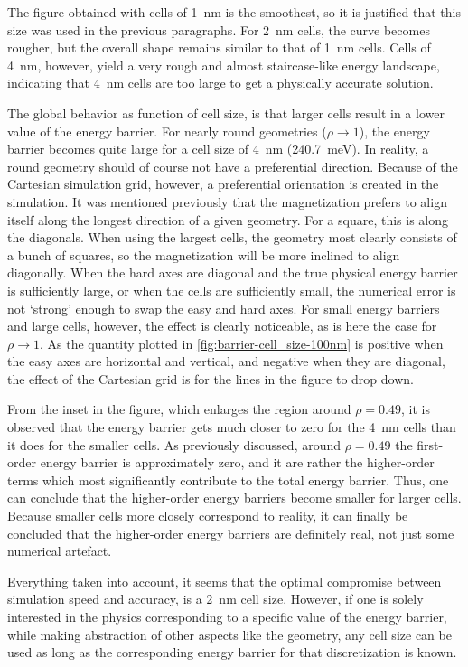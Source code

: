 \documentclass[11pt,a4paper,english]{article}
\begin{document}
The figure obtained with cells of \SI{1}{\nano\metre} is the smoothest, so it is justified that this size was used in the previous paragraphs. For \SI{2}{\nano\metre} cells, the curve becomes rougher, but the overall shape remains similar to that of \SI{1}{\nano\metre} cells. Cells of \SI{4}{\nano\metre}, however, yield a very rough and almost staircase-like energy landscape, indicating that \SI{4}{\nano\metre} cells are too large to get a physically accurate solution. \par
The global behavior as function of cell size, is that larger cells result in a lower value of the energy barrier. For nearly round geometries ($\rho \rightarrow 1$), the energy barrier becomes quite large for a cell size of \SI{4}{\nano\metre} (\SI{240.7}{\milli\electronvolt}). In reality, a round geometry should of course not have a preferential direction. Because of the Cartesian simulation grid, however, a preferential orientation is created in the simulation. It was mentioned previously that the magnetization prefers to align itself along the longest direction of a given geometry. For a square, this is along the diagonals. When using the largest cells, the geometry most clearly consists of a bunch of squares, so the magnetization will be more inclined to align diagonally. When the hard axes are diagonal and the true physical energy barrier is sufficiently large, or when the cells are sufficiently small, the numerical error is not `strong' enough to swap the easy and hard axes. For small energy barriers and large cells, however, the effect is clearly noticeable, as is here the case for $\rho \rightarrow 1$. As the quantity plotted in \cref{fig:barrier-cell_size-100nm} is positive when the easy axes are horizontal and vertical, and negative when they are diagonal, the effect of the Cartesian grid is for the lines in the figure to drop down. \par
From the inset in the figure, which enlarges the region around $\rho=0.49$, it is observed that the energy barrier gets much closer to zero for the \SI{4}{\nano\metre} cells than it does for the smaller cells. As previously discussed, around $\rho=0.49$ the first-order energy barrier is approximately zero, and it are rather the higher-order terms which most significantly contribute to the total energy barrier. Thus, one can conclude that the higher-order energy barriers become smaller for larger cells. Because smaller cells more closely correspond to reality, it can finally be concluded that the higher-order energy barriers are definitely real, not just some numerical artefact. \par
Everything taken into account, it seems that the optimal compromise between simulation speed and accuracy, is a \SI{2}{\nano\metre} cell size. However, if one is solely interested in the physics corresponding to a specific value of the energy barrier, while making abstraction of other aspects like the geometry, any cell size can be used as long as the corresponding energy barrier for that discretization is known.
\end{document}
